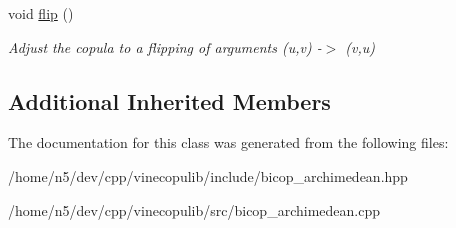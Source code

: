 \begin{DoxyCompactItemize}
\item 
void \hyperlink{class_archimedean_bicop_afc56334b1c34406b5148386d9b7e5f43}{flip} ()\hypertarget{class_archimedean_bicop_afc56334b1c34406b5148386d9b7e5f43}{}\label{class_archimedean_bicop_afc56334b1c34406b5148386d9b7e5f43}

\begin{DoxyCompactList}\small\item\em Adjust the copula to a flipping of arguments (u,v) -\/$>$ (v,u) \end{DoxyCompactList}\end{DoxyCompactItemize}
\subsection*{Additional Inherited Members}


The documentation for this class was generated from the following files\+:\begin{DoxyCompactItemize}
\item 
/home/n5/dev/cpp/vinecopulib/include/bicop\+\_\+archimedean.\+hpp\item 
/home/n5/dev/cpp/vinecopulib/src/bicop\+\_\+archimedean.\+cpp\end{DoxyCompactItemize}
